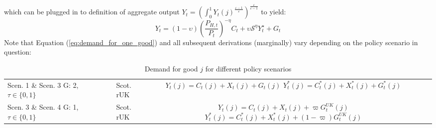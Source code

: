 which can be plugged in to definition of aggregate output $Y_t = \left( \int_{0}^{1} Y_t(j)^{\frac{\varepsilon-1}{\varepsilon}}\right)^{\frac{\varepsilon}{\varepsilon-1}}$ to yield:
\begin{equation}
    Y_t = (1-\upsilon) \left(\frac{P_{H,t}}{P_t}\right)^{-\eta}C_t + \upsilon \mathcal{S}^\eta Y^\star_t + G_t
\end{equation}
Note that Equation (\ref{eq:demand_for_one_good}) and all subsequent derivations (marginally) vary depending on the policy scenario in question:
\begin{table}[H]
    \renewcommand{\arraystretch}{2}
    \centering
    \begin{tabular}{l|l|c}
    \makecell{Scen. 1 \& Scen. 3\\ G: 2, $\tau \in \{0, 1\}$} & \makecell{Scot. \\ rUK } & 
        \makecell{
            $Y_t(j) = C_t(j) + X_t(j) + G_t(j)$\\
            $Y^*_t(j) = C^*_t(j) + X^*_t(j) + G^*_t(j)$
        }  \\ 
        \makecell{Scen. 3 \& Scen. 4\\ G: 1, $\tau \in \{0, 1\}$} & \makecell{Scot. \\ rUK } & 
        \makecell{
            $Y_t(j) = C_t(j) + X_t(j) + \varpi G^{UK}_t(j)$\\
            $Y^*_t(j) = C^*_t(j) + X^*_t(j) + (1-\varpi) G^{UK}_t(j)$
        }   
    \end{tabular}
    \caption{Demand for good $j$ for different policy scenarios}
\end{table}
